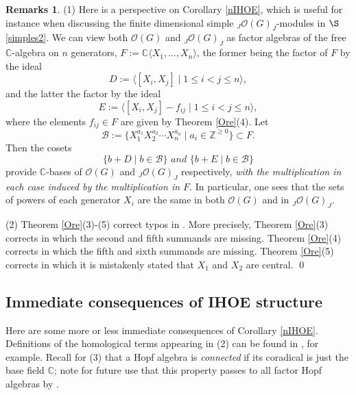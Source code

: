 \documentclass{amsart}
\numberwithin{equation}{section}
\theoremstyle{definition}
\newtheorem{remarks}[theorem]{Remarks}
\begin{document}
\begin{remarks}\label{compwg2}
(1) Here is a perspective on Corollary \ref{nIHOE}, which is useful for instance when discussing the finite dimensional simple ${}_J\mathcal{O}(G)_J$-modules in $\S$\ref{simples2}. We can view both $\mathcal{O}(G)$ and ${}_J\mathcal{O}(G)_J$ as factor algebras of the free $\mathbb{C}$-algebra on $n$ generators, $F := \mathbb{C}\langle X_1,\dots, X_n \rangle$, the former being the factor of $F$ by the ideal 
$$ D:=\langle [X_i,X_j]\mid 1 \leq i < j \leq n \rangle, $$
and the latter the factor by the ideal
$$ E:= \langle [X_i,X_j] - f_{ij}\mid 1 \leq i < j \leq n \rangle, $$
where the elements $f_{ij}\in F$ are given by Theorem \ref{Ore}(4). Let 
$$ \mathcal{B}:= \{X_1^{a_1} X_2^{a_2}\cdots X_n^{a_n}\mid a_i \in \mathbb{Z}^{\geq 0} \}  \subset F.$$ Then the cosets $$ \{ b +D \mid b \in \mathcal{B} \} \textit{   and   }\{ b +E \mid b \in \mathcal{B} \}$$
provide $\mathbb{C}$-bases of $\mathcal{O}(G)$ and ${}_J\mathcal{O}(G)_J$ respectively, \emph{with the multiplication in each case induced by the multiplication in $F$}. In particular, one sees that the sets of powers of each generator $X_i$ are the same in both $\mathcal{O}(G)$ and in ${}_J\mathcal{O}(G)_J$.

(2) Theorem \ref{Ore}(3)-(5) correct typos in \cite[Lemma 3.1]{G2}. More precisely, Theorem \ref{Ore}(3) corrects \cite[Lemma 3.1(4)]{G2} in which the second and fifth summands are missing. Theorem \ref{Ore}(4) corrects \cite[Lemma 3.1(5)]{G2} in which the fifth and sixth summands are missing. Theorem \ref{Ore}(5) corrects \cite[Lemma 3.1(6)]{G2} in which it is mistakenly stated that $X_1$ and $X_2$ are central. \qed
\end{remarks}

\subsection{Immediate consequences of IHOE structure}\label{immediate}
Here are some more or less immediate consequences of Corollary \ref{nIHOE}. Definitions of the homological terms appearing in (2) can be found in \cite{BZ}, for example. Recall for (3) that a Hopf algebra is \emph{connected} \cite[Definition 5.1.5]{M} if its coradical is just the base field $\mathbb{C}$; note for future use that this property passes to all factor Hopf algebras by \cite[Corollary 5.3.5]{M}.
\end{document}
